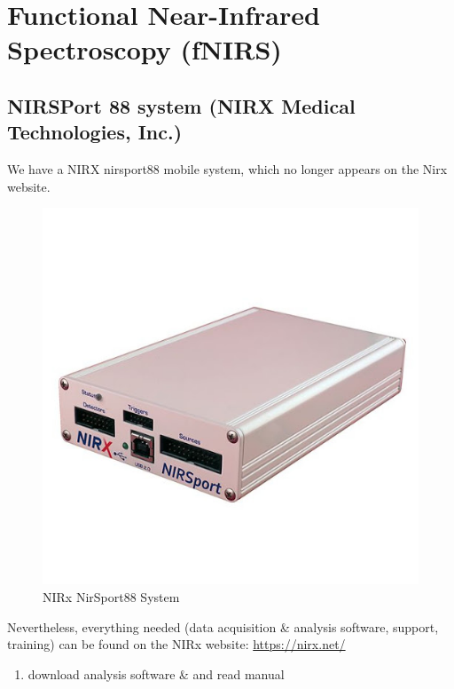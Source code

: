 \documentclass[
]{book}
\providecommand{\tightlist}{%
  \setlength{\itemsep}{0pt}\setlength{\parskip}{0pt}}
\begin{document}
\hypertarget{functional-near-infrared-spectroscopy-fnirs}{%
\chapter{Functional Near-Infrared Spectroscopy (fNIRS)}\label{functional-near-infrared-spectroscopy-fnirs}}

\hypertarget{nirsport-88-system-nirx-medical-technologies-inc.}{%
\section{NIRSPort 88 system (NIRX Medical Technologies, Inc.)}\label{nirsport-88-system-nirx-medical-technologies-inc.}}

We have a NIRX nirsport88 mobile system, which no longer appears on the Nirx website.

\begin{figure}
\centering
\includegraphics{docs/resources/nirsport88.jpg}
\caption{NIRx NirSport88 System}
\end{figure}

Nevertheless, everything needed (data acquisition \& analysis software, support, training) can be found on the NIRx website:
\url{https://nirx.net/}

\begin{enumerate}
\def\labelenumi{\arabic{enumi}.}
\tightlist
\item
  download analysis software \& and read manual
\end{enumerate}
\end{document}
